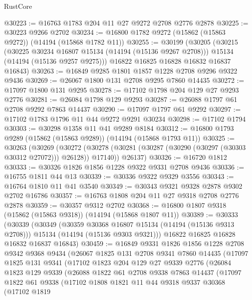 \begin{lexlean}{RustCore}
\begin{coremodule}
@30223 := @16763 @1783 @204 @11 @27 @9272 @2708 @2776 @2878
@30225 := @30223 @9266 @2702
@30234 := @16800 @1782 @9272 (@15862 (@15863 @9272)) (@14194 (@15868 @1782 @11))
@30255 := @30199
    (@30205
      (@30215
        (@30225 @30234 @16807 @15134 (@14194 (@15136 @9267 @2708)))
        @15134
        (@14194 (@15136 @9257 @9275)))
      @16822
      @16825
      @16828
      @16832
      @16837
      @16843)
@30263 := @16849 @9285 @1801 @1857 @1228 @2708 @9296 @9322 @9436
@30269 := @26067 @1800 @131 @2708 @9295 @7860 @14435
@30272 := @17097 @1800 @131 @9295
@30278 := @17102 @1798 @204 @129 @27 @9293 @2776
@30281 := @26084 @1798 @129 @9293
@30287 := @26088 @1797 @61 @2708 @9292 @7863 @14437
@30290 := @17097 @1797 @61 @9292
@30297 := @17102 @1783 @1796 @11 @44 @9272 @9291 @30234
@30298 := @17102 @1794
@30303 := @30298 @1358 @11 @41 @9289 @8184
@30312 := @16800 @1793 @9289 (@15862 (@15863 @9289)) (@14194 (@15868 @1793 @11))
@30325 := @30263
    (@30269
      (@30272 (@30278 (@30281 (@30287 (@30290 (@30297 (@30303 @30312 @27072))) @26128)) @17140))
      @26137)
@30326 := @16720 @1812
@30333 := @30326 @1826 @1856 @1228 @9322 @9331 @2708 @9436
@30336 := @16755 @1811 @44 @13
@30339 := @30336 @9322 @9329 @3556
@30343 := @16764 @1810 @11 @41 @3540
@30349 := @30343 @9321 @9328 @2878 @9302 @2702 @16786
@30357 := @16763 @1808 @204 @11 @27 @9318 @2708 @2776 @2878
@30359 := @30357 @9312 @2702
@30368 := @16800 @1807 @9318 (@15862 (@15863 @9318)) (@14194 (@15868 @1807 @11))
@30389 := @30333
    (@30339
      (@30349
        (@30359 @30368 @16807 @15134 (@14194 (@15136 @9313 @2708)))
        @15134
        (@14194 (@15136 @9303 @9321)))
      @16822
      @16825
      @16828
      @16832
      @16837
      @16843)
@30459 := @16849
    @9331
    @1826
    @1856
    @1228
    @2708
    @9342
    @9368
    @9434
    (@26067
      @1825
      @131
      @2708
      @9341
      @7860
      @14435
      (@17097
        @1825
        @131
        @9341
        (@17102
          @1823
          @204
          @129
          @27
          @9339
          @2776
          (@26084
            @1823
            @129
            @9339
            (@26088
              @1822
              @61
              @2708
              @9338
              @7863
              @14437
              (@17097
                @1822
                @61
                @9338
                (@17102
                  @1808
                  @1821
                  @11
                  @44
                  @9318
                  @9337
                  @30368
                  (@17102
                    @1819

\end{coremodule}
\end{lexlean}
